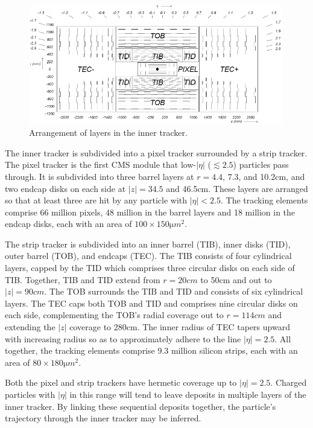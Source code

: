 \documentclass[oneside, letterpaper, 12pt, oldfontcommands]{memoir}
\begin{document}
\begin{figure}[hbtp]
  \begin{center}
    \includegraphics[width=0.99\textwidth]{Figures/tracker_schematic.png}
    \caption{
    Arrangement of layers in the inner tracker.
    }
    \label{fig:inner_tracker}
  \end{center}
\end{figure}

The inner tracker is subdivided into a pixel tracker surrounded by a strip tracker. The pixel tracker is the first CMS module that
low-$|\eta|$ ($\lesssim 2.5$) particles pass through. It is subdivided into three barrel layers at $r = 4.4$, 7.3, and 10.2\unit{cm},
and two endcap disks on each side at $|z| = 34.5$ and 46.5\unit{cm}. These layers are arranged so that at least three are hit by
any particle with $|\eta| < 2.5$.
The tracking elements comprise 66 million pixels, 48 million in the barrel layers
and 18 million in the endcap disks, each with an area of $100{\times}150\unit{\micro m}^{2}$.

The strip tracker is subdivided into an inner barrel (TIB), inner disks (TID), outer barrel (TOB), and endcaps (TEC).
The TIB consists of four cylindrical layers, capped by the TID which comprises three circular disks on each side of TIB.
Together, TIB and TID extend from $r = 20\unit{cm}$ to 50\unit{cm} and out to $|z| = 90\unit{cm}$.
The TOB surrounds the TIB and TID and consists of six cylindrical layers. The TEC caps both TOB and TID and comprises
nine circular disks on each side, complementing the TOB's radial coverage out to $r = 114\unit{cm}$ and extending the $|z|$ coverage
to 280\unit{cm}. The inner radius of TEC tapers upward with increasing radius so as to approximately adhere to the line $|\eta| = 2.5$.
All together, the tracking elements comprise 9.3 million silicon strips, each with an area of $80{\times}180\unit{\micro m}^{2}$.

Both the pixel and strip trackers have hermetic coverage up to $|\eta| = 2.5$. Charged particles with $|\eta|$ in this range will
tend to leave deposits in multiple layers of the inner tracker. By linking these sequential deposits together, the particle's trajectory through the inner
tracker may be inferred.
\end{document}
